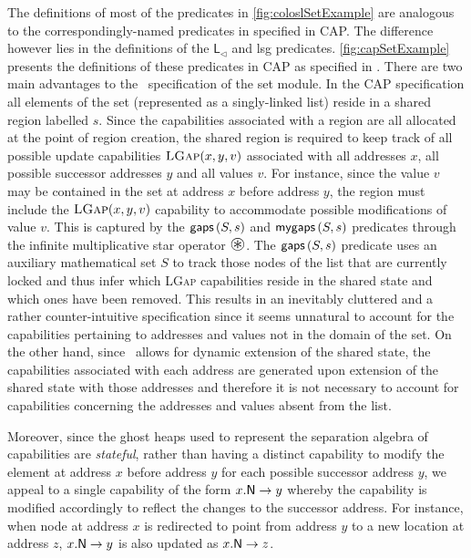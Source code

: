 The definitions of most of the predicates in \fig\ref{fig:coloslSetExample} are analogous to the correspondingly-named predicates in \cite{cap-ecoop10} specified in CAP. The difference however lies in the definitions of the 
$\textsf{L}_{\triangleleft}$ and \textsf{lsg} predicates. 
\fig\ref{fig:capSetExample} presents the definitions of these predicates in CAP as specified in \cite{cap-ecoop10}. 
There are two main advantages to the \colosl\ specification of the set module. In the CAP specification all elements of the set (represented as a singly-linked list) reside in a shared region labelled $s$. Since the capabilities associated with a region are all allocated at the point of region creation, the shared region is required to keep track of all possible update capabilities $\textsc{LGap}(x, y, v)$ associated with all addresses $x$, all possible successor addresses $y$ and all values $v$. For instance, since the value $v$ may be contained in the set at address $x$ before address $y$, the region must include the $\textsc{LGap}(x, y, v)$ capability to accommodate possible modifications of value $v$. This is captured by the $\textsf{gaps}\left(S, s\right)$ and $\textsf{mygaps}\left(S, s\right)$ predicates through the infinite multiplicative star operator $\iterStar$. The $\textsf{gaps}\left(S, s\right)$ predicate uses an auxiliary mathematical set $S$ to track those nodes of the list that are currently locked and thus infer which \textsc{LGap} capabilities reside in the shared state and which ones have been removed. This results in an inevitably cluttered and a rather counter-intuitive specification since it seems unnatural to account for the capabilities pertaining to addresses and values not in the domain of the set. On the other hand, since \colosl\ allows for dynamic extension of the shared state, the capabilities associated with each address are generated upon extension of the shared state with those addresses and therefore it is not necessary to account for capabilities concerning the addresses and values absent from the list. 

Moreover, since the ghost heaps used to represent the separation algebra of capabilities are \emph{stateful}, rather than having a distinct capability to modify the element at address $x$ before address $y$ for each possible successor address $y$, we appeal to a single capability of the form $\nextT{x}{y}$ whereby the capability is modified accordingly to reflect the changes to the successor address. For instance, when node at address $x$ is redirected to point from address $y$ to a new location at address $z$, $\nextT{x}{y}$ is also updated as $\nextT{x}{z}$. 

